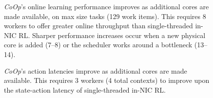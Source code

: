 \documentclass[sigconf,natbib=false]{acmart}
\newcommand{\Coopfw}{\emph{CoOp}}
\begin{document}
\begin{figure}
	\caption{
		\Coopfw{}'s online learning performance improves as additional cores are made available, on max size tasks (\num{129} work items). This requires \num{8} workers to offer greater online throughput than single-threaded in-NIC RL. Sharper performance increases occur when a new physical core is added (\numrange{7}{8}) or the scheduler works around a bottleneck (\numrange{13}{14}).\label{fig:vary-core}}
\end{figure}

\begin{figure}
	\caption{\Coopfw{}'s action latencies improve as additional cores are made available. This requires \num{3} workers (4 total contexts) to improve upon the state-action latency of single-threaded in-NIC RL.\label{fig:vary-core-latency}}
\end{figure}
\end{document}

